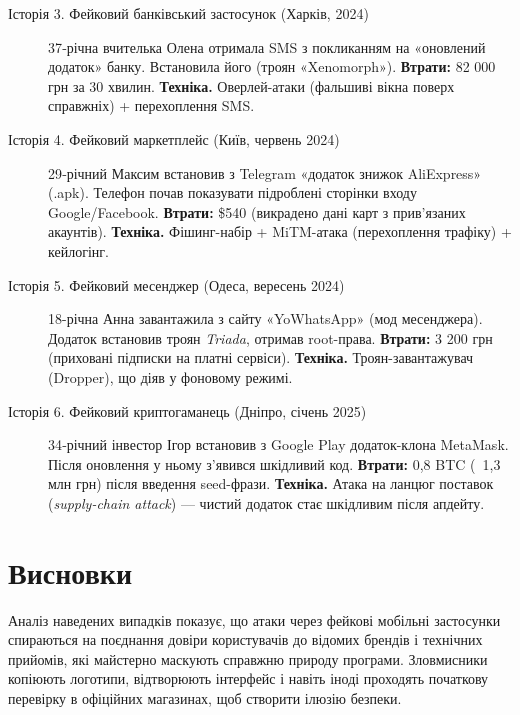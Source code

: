 \begin{description}
    \item[Історія 3. Фейковий банківський застосунок (Харків, 2024)]
    37‑річна вчителька Олена отримала SMS з покликанням на «оновлений додаток» банку. Встановила його (троян «Xenomorph»).
    \newline \textbf{Втрати:} 82 000 грн за 30 хвилин.
    \newline \textbf{Техніка.} Оверлей-атаки (фальшиві вікна поверх справжніх) + перехоплення SMS.

    \item[Історія 4. Фейковий маркетплейс (Київ, червень 2024)]
    29‑річний Максим встановив з Telegram «додаток знижок AliExpress» (.apk). Телефон почав показувати підроблені сторінки входу Google/Facebook.
    \newline \textbf{Втрати:} \$540 (викрадено дані карт з прив'язаних акаунтів).
    \newline \textbf{Техніка.} Фішинг-набір + MiTM-атака (перехоплення трафіку) + кейлогінг.

    \item[Історія 5. Фейковий месенджер (Одеса, вересень 2024)]
    18-річна Анна завантажила з сайту «YoWhatsApp» (мод месенджера). Додаток встановив троян \textit{Triada}, отримав root-права.
    \newline \textbf{Втрати:} 3 200 грн (приховані підписки на платні сервіси).
    \newline \textbf{Техніка.} Троян-завантажувач (Dropper), що діяв у фоновому режимі.

    \newpage

    \item[Історія 6. Фейковий криптогаманець (Дніпро, січень 2025)]
    34‑річний інвестор Ігор встановив з Google Play додаток-клона MetaMask. Після оновлення у ньому з’явився шкідливий код.
    \newline \textbf{Втрати:} 0,8 BTC (~1,3 млн грн) після введення seed-фрази.
    \newline \textbf{Техніка.} Атака на ланцюг поставок (\textit{supply-chain attack}) — чистий додаток стає шкідливим після апдейту.
\end{description}

\section*{Висновки}

Аналіз наведених випадків показує, що атаки через фейкові мобільні застосунки спираються на поєднання довіри користувачів до відомих брендів і технічних прийомів, які майстерно маскують справжню природу програми. Зловмисники копіюють логотипи, відтворюють інтерфейс і навіть іноді проходять початкову перевірку в офіційних магазинах, щоб створити ілюзію безпеки.

